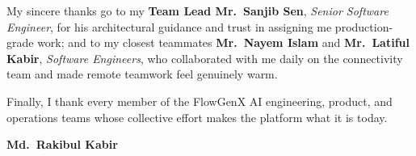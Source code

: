 My sincere thanks go to my \textbf{Team Lead Mr.~Sanjib Sen},
\emph{Senior Software Engineer}, for his architectural guidance and
trust in assigning me production-grade work; and to my closest
teammates \textbf{Mr.~Nayem Islam} and \textbf{Mr.~Latiful Kabir},
\emph{Software Engineers}, who collaborated with me daily on the
connectivity team and made remote teamwork feel genuinely warm.

Finally, I thank every member of the FlowGenX AI engineering, product,
and operations teams whose collective effort makes the platform what
it is today.

\vspace{0.3cm}

\hfill\textbf{Md.~Rakibul Kabir}

\endgroup
\newpage

